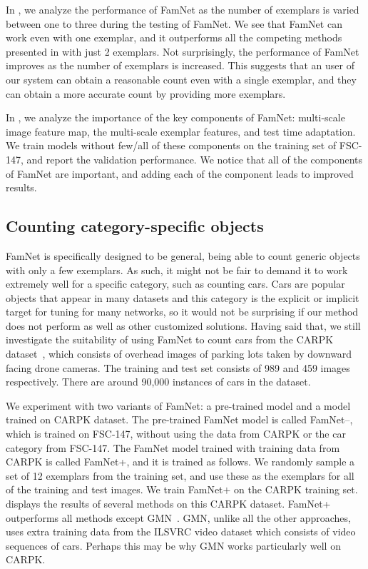 In , we analyze the performance of FamNet as the number of exemplars is varied between one to three during the testing of FamNet. We see that FamNet can work even with one exemplar, and it outperforms all the competing methods presented in  with just 2 exemplars. Not surprisingly, the performance of FamNet improves as the number of exemplars is increased. This suggests that an user of our system can obtain a reasonable count even with a single exemplar, and they can obtain a more accurate count by providing more exemplars. 

In , we analyze the importance of the key components of FamNet: multi-scale image feature map, the multi-scale exemplar features, and test time adaptation. We train models without few/all of these components on the training set of FSC-147, and report the validation performance. We notice that all of the components of FamNet are important, and adding each of the component leads to improved results. 

\subsection{Counting category-specific objects}

FamNet is specifically designed to be general, being able to count generic objects with only a few exemplars. As such, it might not be fair to demand it to work extremely well for a specific category, such as counting cars. Cars are popular objects that appear in many datasets and this category is the explicit or implicit target for tuning for many networks, so it would not be surprising if our method does not perform as well as other customized solutions. Having said that, we still investigate the suitability of using FamNet to count cars from the CARPK dataset~\cite{hsieh2017drone}, which consists of overhead images of parking lots taken by downward facing drone cameras. The training and test set consists of 989 and 459 images respectively. There are around 90,000 instances of cars in the dataset. 

We experiment with two variants of FamNet: a pre-trained model and a model trained on CARPK dataset. The pre-trained FamNet model is called FamNet--, which is trained on FSC-147, without using the data from CARPK or the car category from FSC-147. The FamNet model trained with training data from CARPK is called FamNet+, and it is trained as follows. 
We randomly sample a set of 12 exemplars from the training set, and use these as the exemplars for all of the training and test images. We train FamNet$+$ on the CARPK training set.  displays the results of several methods on this CARPK dataset.
FamNet+ outperforms all methods except GMN~\cite{lu2018class}. GMN, unlike all the other approaches, uses extra training data from the ILSVRC video dataset which consists of video sequences of cars. Perhaps this may be why GMN works particularly well on CARPK.


